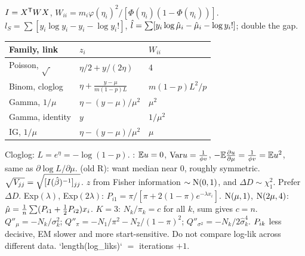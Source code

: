 \bx
{}
 $I=X^{\mathsf T} WX$, $W_{ii}=m_i\varphi(\eta_i)^2/[\Phi(\eta_i)(1-\Phi(\eta_i))]$.
 $l_S=\sum[y_i\log y_i-y_i-\log y_i!]$, $\hat l=\sum[y_i\log\hat{\mu}_i-\hat{\mu}_i-\log y_i!]$; double the gap.
\bx
{}\par
{\renewcommand{\arraystretch}{1.08}%
\begin{tabular}{@{}|p{34pt}|p{54pt}|p{40pt}|@{}}\hline
\rowcolor{hdr}Family, link&$z_i$&$W_{ii}$\\\hline
Poisson, $\sqrt{\ }$&$\eta/2+y/(2\eta)$&4\\\hline
Binom, cloglog&$\eta+\frac{y-\mu}{m(1-p)L}$&$m(1-p)L^2/p$\\\hline
Gamma, $1/\mu$&$\eta-(y-\mu)/\mu^2$&$\mu^2$\\\hline
Gamma, identity&$y$&$1/\mu^2$\\\hline
IG, $1/\mu$&$\eta-(y-\mu)/\mu^2$&$\mu$\\\hline
\end{tabular}}
Cloglog: $L=e^\eta=-\log(1-p)$.
 : $\mathbb{E} u=0$, $\mathrm{Var} u=\frac1{\phi v}$, $-\mathbb{E}\frac{\partial u}{\partial\mu}=\frac1{\phi v}=\mathbb{E} u^2$, same as $\partial\log L/\partial\mu$.
\li{} (old R): want median near 0, roughly symmetric.
\li{} $\sqrt{V_{jj}}=\sqrt{[I(\hat{\beta})^{-1}]_{jj}}$.
\li{} $z$ from Fisher information $\sim\mathrm{N}(0,1)$, and $\Delta D\sim\chi^2_1$. Prefer $\Delta D$.
\li Exp$(\lambda)$, Exp$(2\lambda)$: $P_{i1}=\pi/[\pi+2(1-\pi)e^{-\lambda x_i}]$.
\li $\mathrm{N}(\mu,1)$, $\mathrm{N}(2\mu,4)$: $\hat{\mu}=\frac1n\sum(P_{i1}+\frac12P_{i2})x_i$.
\li $K=3$: $N_k/\pi_k=c$ for all $k$, sum gives $c=n$.
\li{} $Q''_\mu=-N_k/\sigma_k^2$; $Q''_\pi=-N_1/\pi^2-N_2/(1-\pi)^2$; $Q''_{\sigma^2}=-N_k/2\hat\sigma_k^4$.
\li{} $P_{ik}$ less decisive, EM slower and more start-sensitive. Do not compare log-lik across different data.
\li`length(log_liks)` $=$ iterations $+1$.
